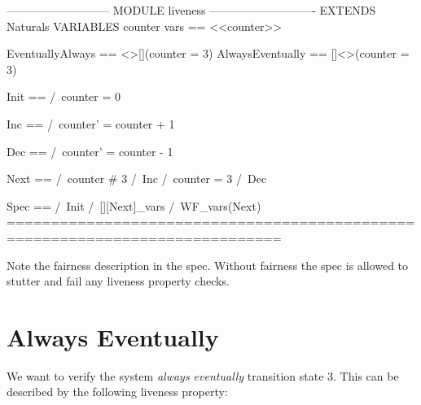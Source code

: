 \begin{tla}
--------------------------- MODULE liveness ----------------------------
EXTENDS Naturals
VARIABLES counter 
vars == <<counter>>

EventuallyAlways == <>[](counter = 3)
AlwaysEventually == []<>(counter = 3)

Init ==
    /\ counter = 0

Inc == 
    /\ counter' = counter + 1

Dec == 
    /\ counter' = counter - 1

Next ==
    \/ /\ counter # 3
       /\ Inc
    \/ /\ counter = 3
       /\ Dec

Spec ==
  /\ Init
  /\ [][Next]_vars
  /\ WF_vars(Next)
=============================================================================
\end{tla}
\begin{tlatex}
\@x{}\moduleLeftDash{}\moduleRightDash\@xx{}%
%
%
%
\@pvspace{8.0pt}%
%
%
\@pvspace{8.0pt}%
%
%
\@pvspace{8.0pt}%
%
%
\@pvspace{8.0pt}%
%
%
\@pvspace{8.0pt}%
%
%
%
%
%
\@pvspace{8.0pt}%
%
%
%
%
\@x{}\bottombar\@xx{}%
\end{tlatex}

Note the fairness description in the spec. Without fairness the spec is
allowed to stutter and fail any liveness property checks.

\section{Always Eventually}

We want to verify the system \textit{always eventually} transition state 3. This
can be described by the following liveness property:\newline

